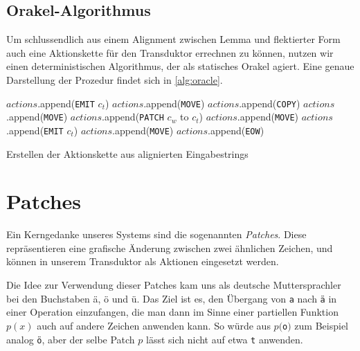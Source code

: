 \documentclass[11pt,a4paper]{article}
\newcommand{\action}[1]{\texttt{#1}}
\begin{document}
\subsection{Orakel-Algorithmus}
\label{sec:orakel-alg}
Um schlussendlich aus einem Alignment zwischen Lemma und flektierter Form auch eine Aktionskette für den Transduktor errechnen zu können, nutzen wir einen deterministischen Algorithmus, der als statisches Orakel agiert. Eine genaue Darstellung der Prozedur findet sich in \autoref{alg:oracle}.

\begin{algorithm}[htb]
\begin{algorithmic}
    	\STATE $actions$.append(\action{EMIT} $c_t$)
    	\STATE $actions$.append(\action{MOVE})
    	\STATE $actions$.append(\action{COPY})
        \STATE $actions$.append(\action{MOVE})
    	\STATE $actions$.append(\action{PATCH} $c_w$ to $c_t$)
        \STATE $actions$.append(\action{MOVE})
    	\STATE $actions$.append(\action{EMIT} $c_t$)
        \STATE $actions$.append(\action{MOVE})
    \ENDIF
\ENDFOR
\STATE $actions$.append(\action{EOW})
\end{algorithmic}
\caption{Erstellen der Aktionskette aus alignierten Eingabestrings}
\label{alg:oracle}
\end{algorithm}

\section{Patches}
\label{sec:patches}
Ein Kerngedanke unseres Systems sind die sogenannten \textit{Patches}. Diese repräsentieren eine grafische Änderung zwischen zwei ähnlichen Zeichen, und können in unserem Transduktor als Aktionen eingesetzt werden.

Die Idee zur Verwendung dieser Patches kam uns als deutsche Muttersprachler bei den Buchstaben ä, ö und ü. Das Ziel ist es, den Übergang von \texttt{a} nach \texttt{ä} in einer Operation einzufangen, die man dann im Sinne einer partiellen Funktion $p(x)$ auch auf andere Zeichen anwenden kann. So würde aus $p($\texttt{o}$)$ zum Beispiel analog \texttt{ö}, aber der selbe Patch $p$ lässt sich nicht auf etwa \texttt{t} anwenden. 
\end{document}
